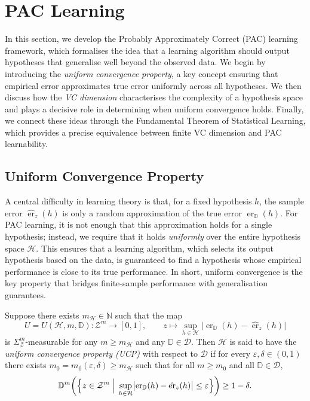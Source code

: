 \section{PAC Learning}\label{sec:pac-learning}

In this section, we develop the Probably Approximately Correct (PAC) learning framework, which formalises the idea that a learning algorithm should output hypotheses that generalise well beyond the observed data. We begin by introducing the \emph{uniform convergence property}, a key concept ensuring that empirical error approximates true error uniformly across all hypotheses. We then discuss how the \emph{VC dimension} characterises the complexity of a hypothesis space and plays a decisive role in determining when uniform convergence holds. Finally, we connect these ideas through the Fundamental Theorem of Statistical Learning, which provides a precise equivalence between finite VC dimension and PAC learnability.

\subsection{Uniform Convergence Property}

A central difficulty in learning theory is that, for a fixed hypothesis $h$, the sample error $\hat{\operatorname{er}}_{z}(h)$ is only a random approximation of the true error $\operatorname{er}_{\mathbb{D}}(h)$. For PAC learning, it is not enough that this approximation holds for a single hypothesis; instead, we require that it holds \emph{uniformly} over the entire hypothesis space $\mathcal{H}$. This ensures that a learning algorithm, which selects its output hypothesis based on the data, is guaranteed to find a hypothesis whose empirical performance is close to its true performance. In short, uniform convergence is the key property that bridges finite-sample performance with generalisation guarantees.

\begin{definition}
    Suppose there exists $m_{\mathcal{H}} \in \mathbb{N}$ such that the map
    \[
        U = U(\mathcal{H}, m, \mathbb{D}) : \mathcal{Z}^m \to [0,1], \qquad
        z \mapsto \sup_{h \in \mathcal{H}} \bigl| \operatorname{er}_{\mathbb{D}}(h) - \hat{\operatorname{er}}_{z}(h) \bigr|
    \]
    is $\Sigma_{\mathcal{Z}}^m$-measurable for any $m \geq m_{\mathcal{H}}$ and any $\mathbb{D} \in \mathcal{D}$. Then $\mathcal{H}$ is said to have the \emph{uniform convergence property (UCP)} with respect to $\mathcal{D}$ if for every $\varepsilon, \delta \in (0,1)$ there exists $m_0 = m_0(\varepsilon,\delta) \geq m_{\mathcal{H}}$ such that for all $m \geq m_0$ and all $\mathbb{D} \in \mathcal{D}$,
    \[
        \mathbb{D}^m\!\left( \Bigl\{ z \in \mathcal{Z}^m \;\Big|\;
                          \sup_{h \in \mathcal{H}} \bigl| \operatorname{er}_{\mathbb{D}}(h) - \hat{\operatorname{er}}_{z}(h) \bigr| \leq \varepsilon \Bigr\} \right) \geq 1-\delta.
    \]
\end{definition}

